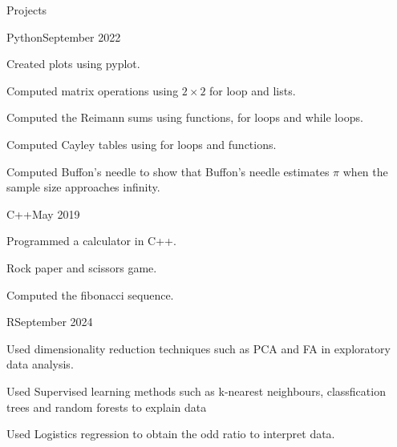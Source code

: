 \documentclass[
	11pt, %
]{resume} %
\begin{document}
\begin{rSection}{Projects}

	\begin{rSubsection}{Python}{September 2022}{}{}
		\item Created plots using pyplot.
		\item Computed matrix operations using $2 \times 2 $ for loop and lists.
		\item Computed the Reimann sums using functions, for loops and while loops.
		\item Computed Cayley tables using for loops and functions.
		\item Computed Buffon's needle to show that Buffon's needle estimates $\pi$ when the sample size approaches infinity.
	\end{rSubsection}

	\begin{rSubsection}{C++}{May 2019}{}{}
		\item Programmed a calculator in C++.
		\item Rock paper and scissors game.
		\item Computed the fibonacci sequence.
	\end{rSubsection}



	\begin{rSubsection}{R}{September 2024}{}{}
		\item Used dimensionality reduction techniques such as PCA and FA in exploratory data analysis.
		\item Used Supervised learning methods such as k-nearest neighbours, classfication trees and random forests to explain data
		\item Used Logistics regression to obtain the odd ratio to interpret data.


\end{rSubsection}
\end{rSection}
\end{document}
